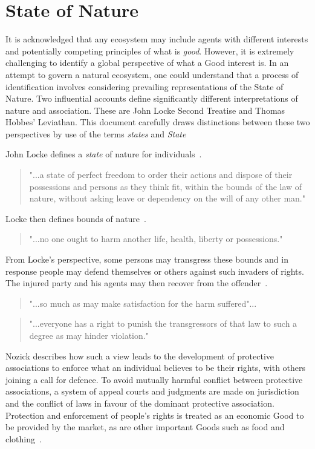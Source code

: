 \documentclass[11pt, oneside]{book}   	%
\begin{document}
\pagebreak

\section{State of Nature}
It is acknowledged that any ecosystem may include agents with different interests and potentially competing principles of what is \emph{good}.
However, it is extremely challenging to identify a global perspective of what a Good interest is.
In an attempt to govern a natural ecosystem, one could understand that a process of identification involves considering prevailing representations of the State of Nature.
Two influential accounts define significantly different interpretations of nature and association.
These are John Locke Second Treatise and Thomas Hobbes' Leviathan.
This document carefully draws distinctions between these two perspectives by use of the terms \emph{states} and \emph{State}\

John Locke defines a \emph{state} of nature for individuals~\cite{jl1}.

\begin{quote}
"...a state of perfect freedom to order their actions and dispose of their possessions and persons as they think fit, within the bounds of the law of nature, without asking leave or dependency on the will of any other man."
\end{quote}

Locke then defines bounds of nature~\cite{jl1}.

\begin{quote}
"...no one ought to harm another life, health, liberty or possessions."
\end{quote}

From Locke's perspective, some persons may transgress these bounds and in response people may defend themselves or others against such invaders of rights.
The injured party and his agents may then recover from the offender~\cite{jl1}.

\begin{quote}
"...so much as may make satisfaction for the harm suffered"...
\end{quote}
\begin{quote}
"...everyone has a right to punish the transgressors of that law to such a degree as may hinder violation."
\end{quote}

Nozick describes how such a view leads to the development of protective associations to enforce what an individual believes to be their rights, with others joining a call for defence.
To avoid mutually harmful conflict between protective associations, a system of appeal courts and judgments are made on jurisdiction and the conflict of laws in favour of the dominant protective association.
Protection and enforcement of people's rights is treated as an economic Good to be provided by the market, as are other important Goods such as food and clothing~\cite{rn1}.\
\end{document}
